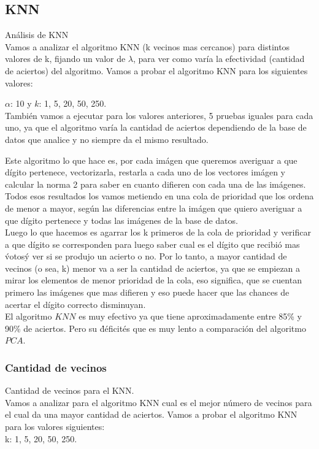\subsection{KNN}
Análisis de KNN
\\
Vamos a analizar el algoritmo KNN (k vecinos mas cercanos) para distintos valores de k, fijando un valor de $\lambda$, para ver como varía la efectividad (cantidad de aciertos) del algoritmo.
Vamos a probar el algoritmo KNN para los siguientes valores:

$\alpha$: 10  y $k$: 1, 5, 20, 50, 250.\\

También vamos a ejecutar para los valores anteriores, 5 pruebas iguales para cada uno, ya que el algoritmo varía la cantidad de aciertos dependiendo de la base de datos que analice y no siempre da el mismo resultado.

Este algoritmo lo que hace es, por cada imágen que queremos averiguar a que dígito pertenece, vectorizarla, restarla a cada uno de los vectores imágen y calcular la norma 2 para saber en cuanto difieren con cada una de las imágenes.
Todos esos resultados los vamos metiendo en una cola de prioridad que los ordena de menor a mayor, según las diferencias entre la imágen que quiero averiguar a que dígito pertenece y todas las imágenes de la base de datos.
\\
Luego lo que hacemos es agarrar los k primeros de la cola de prioridad y verificar a que dígito se corresponden para luego saber cual es el dígito que recibió mas \'votos\' y ver si se produjo un acierto o no.
Por lo tanto, a mayor cantidad de vecinos (o sea, k) menor va a ser la cantidad de aciertos, ya que se empiezan a mirar los elementos de menor prioridad de la cola, eso significa, que se cuentan primero las imágenes que mas difieren y eso puede hacer que las chances de acertar el dígito correcto disminuyan.
\\
El algoritmo $KNN$ es muy efectivo ya que tiene aproximadamente entre 85\% y 90\% de aciertos. Pero su \'déficit\' es que es muy lento a comparación del algoritmo $PCA$. 

\subsubsection{Cantidad de vecinos}
Cantidad de vecinos para el KNN.\\ 
Vamos a analizar para el algoritmo KNN cual es el mejor número de vecinos para el cual da una mayor cantidad de aciertos.
Vamos a probar el algoritmo KNN para los valores siguientes:\\
k: 1, 5, 20, 50, 250.\\

